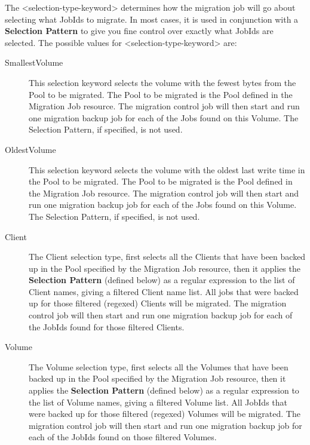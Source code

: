 \begin{description}
  The {\textless}selection-type-keyword{\textgreater} determines how the migration job
  will go about selecting what JobIds to migrate. In most cases, it is
  used in conjunction with a {\bf Selection Pattern} to give you fine
  control over exactly what JobIds are selected.  The possible values
  for {\textless}selection-type-keyword{\textgreater} are:
  \begin{description}
  \item [SmallestVolume] This selection keyword selects the volume with the
        fewest bytes from the Pool to be migrated.  The Pool to be migrated
        is the Pool defined in the Migration Job resource.  The migration
        control job will then start and run one migration backup job for
        each of the Jobs found on this Volume.  The Selection Pattern, if
        specified, is not used.

  \item [OldestVolume] This selection keyword selects the volume with the
        oldest last write time in the Pool to be migrated.  The Pool to be
        migrated is the Pool defined in the Migration Job resource.  The
        migration control job will then start and run one migration backup
        job for each of the Jobs found on this Volume.  The Selection
        Pattern, if specified, is not used.

  \item [Client] The Client selection type, first selects all the Clients
        that have been backed up in the Pool specified by the Migration
        Job resource, then it applies the {\bf Selection Pattern} (defined
        below) as a regular expression to the list of Client names, giving
        a filtered Client name list.  All jobs that were backed up for those
        filtered (regexed) Clients will be migrated.
        The migration control job will then start and run one migration
        backup job for each of the JobIds found for those filtered Clients.

  \item [Volume] The Volume selection type, first selects all the Volumes
        that have been backed up in the Pool specified by the Migration
        Job resource, then it applies the {\bf Selection Pattern} (defined
        below) as a regular expression to the list of Volume names, giving
        a filtered Volume list.  All JobIds that were backed up for those
        filtered (regexed) Volumes will be migrated.
        The migration control job will then start and run one migration
        backup job for each of the JobIds found on those filtered Volumes.


\end{description}
\end{description}
